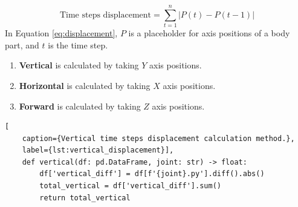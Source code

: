                 \begin{equation} \label{eq:displacement}
                    \text{Time steps displacement} = \sum_{t=1}^{n} \left| P(t) - P(t-1) \right|
                \end{equation}
                In Equation \ref{eq:displacement}, $P$ is a placeholder for axis positions of a body part, and $t$ is the time step. 
                \begin{enumerate}
                    \item \textbf{Vertical} is calculated by taking $Y$ axis positions.
                    \item \textbf{Horizontal} is calculated by taking $X$ axis positions.
                    \item \textbf{Forward} is calculated by taking $Z$ axis positions.
                \end{enumerate}
               
        \begin{lstlisting}[
    caption={Vertical time steps displacement calculation method.}, 
    label={lst:vertical_displacement}],     
    def vertical(df: pd.DataFrame, joint: str) -> float:
        df['vertical_diff'] = df[f'{joint}.py'].diff().abs()
        total_vertical = df['vertical_diff'].sum()
        return total_vertical
        \end{lstlisting}
\cleardoublepage
